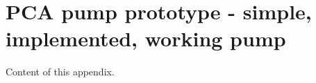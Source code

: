 
\cleardoublepage

\chapter{PCA pump prototype - simple, implemented, working pump}
\label{Appendix:pca_ravenscar}

Content of this appendix.

